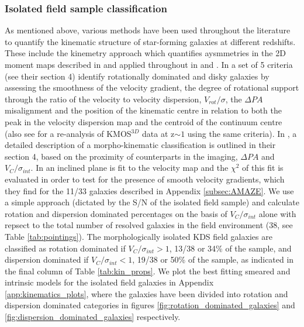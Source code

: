 \documentclass[fleqn,usenatbib]{mn2e}
\begin{document}
\subsubsection{Isolated field sample classification}\label{subsubsection:isolated_classification}
As mentioned above, various methods have been used throughout the literature to quantify the kinematic structure of star-forming galaxies at different redshifts. 
These include the kinemetry approach which quantifies aysmmetries in the 2D moment maps described in \cite{Shapiro2008} and applied throughout in \cite{ForsterSchreiber2009} and \cite{Cresci2009}.
In \cite{Wisnioski2015} a set of 5 criteria (see their section 4) identify rotationally dominated and disky galaxies by assessing the smoothness of the velocity gradient, the degree of rotational support through the ratio of the velocity to velocity dispersion, $V_{rot}/\sigma$, the $\Delta PA$ misalignment and the position of the kinematic centre in relation to both the peak in the velocity dispersion map and the centroid of the continuum centre (also see \cite{Rodrigues2016} for a re-analysis of KMOS$^{3D}$ data at z$\sim 1$ using the same criteria).   
In \cite{Epinat2012}, a detailed description of a morpho-kinematic classification is outlined in their section 4, based on the proximity of counterparts in the imaging, $\Delta PA$ and $V_{C}/\sigma_{int}$.
In \cite{Gnerucci2011} an inclined plane is fit to the velocity map and the $\chi^{2}$ of this fit is evaluated in order to test for the presence of smooth velocity gradients, which they find for the 11/33 galaxies described in Appendix \ref{subsec:AMAZE}.
We use a simple approach (dictated by the S/N of the isolated field sample) and calculate rotation and dispersion dominated percentages on the basis of $V_{C}/\sigma_{int}$ alone with repsect to the total number of resolved galaxies in the field environment (38, see Table \ref{tab:pointings}).
The morphologically isolated KDS field galaxies are classified as rotation dominated if $V_{C}/\sigma_{int} > 1$, 13/38 or 34\% of the sample, and dispersion dominated if $V_{C}/\sigma_{int} < 1$, 19/38 or 50\% of the sample, as indicated in the final column of Table \ref{tab:kin_props}.
We plot the best fitting smeared and intrinsic models for the isolated field galaxies in Appendix \ref{app:kinematics_plots}, where the galaxies have been divided into rotation and dispersion dominated categories in figures \ref{fig:rotation_dominated_galaxies} and \ref{fig:dispersion_dominated_galaxies} respectively.
\end{document}
